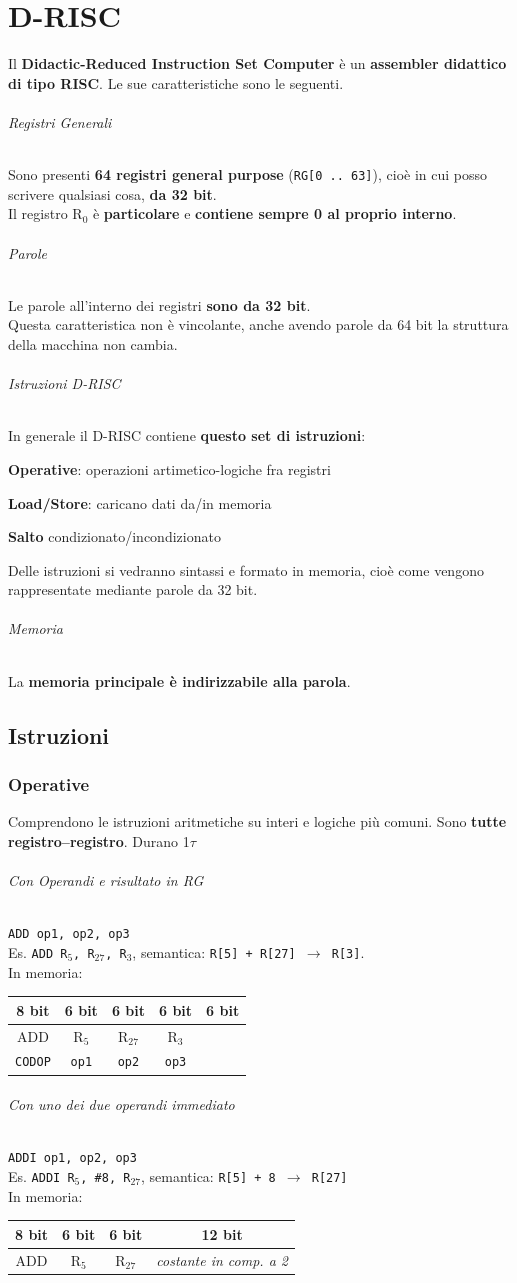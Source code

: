 \documentclass[10pt]{report}
\begin{document}
\chapter{D-RISC}
Il \textbf{Didactic-Reduced Instruction Set Computer} è un \textbf{assembler didattico di tipo RISC}. Le sue caratteristiche sono le seguenti.
\subparagraph{Registri Generali} Sono presenti \textbf{64 registri general purpose} (\texttt{RG[0 .. 63]}), cioè in cui posso scrivere qualsiasi cosa, \textbf{da 32 bit}.\\
Il registro R$_0$ è \textbf{particolare} e \textbf{contiene sempre 0 al proprio interno}.
\subparagraph{Parole} Le parole all'interno dei registri \textbf{sono da 32 bit}.\\
Questa caratteristica non è vincolante, anche avendo parole da 64 bit la struttura della macchina non cambia.
\subparagraph{Istruzioni D-RISC} In generale il D-RISC contiene \textbf{questo set di istruzioni}:
\begin{list}{}{}
	\item \textbf{Operative}: operazioni artimetico-logiche fra registri
	\item \textbf{Load/Store}: caricano dati da/in memoria
	\item \textbf{Salto} condizionato/incondizionato
\end{list}
Delle istruzioni si vedranno sintassi e formato in memoria, cioè come vengono rappresentate mediante parole da 32 bit.
\subparagraph{Memoria} La \textbf{memoria principale è indirizzabile alla parola}.
\section{Istruzioni}
\subsection{Operative}
Comprendono le istruzioni aritmetiche su interi e logiche più comuni. Sono \textbf{tutte registro--registro}. Durano 1$\tau$
\subparagraph{Con Operandi e risultato in RG} \texttt{ADD op1, op2, op3}\\
Es. \texttt{ADD R$_5$, R$_{27}$, R$_3$}, semantica: \texttt{R[5] + R[27] $\rightarrow$ R[3]}.\\
In memoria: \begin{tabular}{| c | c | c | c | c |}
\hline
8 bit & 6 bit & 6 bit & 6 bit & 6 bit \\
\hline
ADD & R$_5$ & R$_{27}$ & R$_3$ & \\
\texttt{CODOP} & \texttt{op1} & \texttt{op2} & \texttt{op3} & \\
\hline
\end{tabular}
\subparagraph{Con uno dei due operandi immediato} \texttt{ADDI op1, op2, op3}\\
Es. \texttt{ADDI R$_5$, \#8, R$_{27}$}, semantica: \texttt{R[5] + 8 $\rightarrow$ R[27]}\\
In memoria: \begin{tabular}{| c | c | c | c |}
\hline
8 bit & 6 bit & 6 bit & 12 bit \\
\hline
ADD & R$_5$ & R$_{27}$ & \textit{costante in comp. a 2} \\
\hline
\end{tabular}
\end{document}

